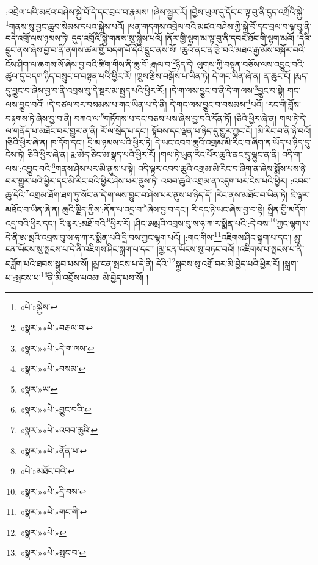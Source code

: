 :འབྲེལ་པའི་མཛའ་བཤེས་སྐྱེ་བོ་དེ་དང་བྲལ་བ་རྣམས། །ཞེས་སྦྱར་རོ། །བྱེས་ཡུལ་དུ་དོང་བ་ལྟ་བུ་ནི་དུད་འགྲོའི་སྐྱེ་\footnote{«པེ་»སྐྱེས་}གནས་སུ་བྱང་ཆུབ་སེམས་དཔའ་སྐྱེས་པའོ། །ཕན་གདགས་འབྲེལ་བའི་མཛའ་བཤེས་ཀྱི་སྐྱེ་བོ་དང་བྲལ་བ་ལྟ་བུ་ནི་བདེ་འགྲོ་ལས་ཉམས་ཏེ། དུད་འགྲོའི་སྐྱེ་གནས་སུ་སྐྱེས་པའོ། །ནོར་གྱི་ལྷག་མ་ལྟ་བུ་ནི་དབང་ཐོང་གི་ལྷག་མའོ། །དེའི་དྲུང་ནས་ཞེས་བྱ་བ་ནི་ནགས་ཚལ་གྱི་བདག་པོ་དེའི་དྲུང་ནས་སོ། །ཆུའི་ནང་ན་རྩེ་བའི་མཐའ་རྒྱ་མོས་བསྐོར་བའི་ངོས་ཤིག་ལ་ཆགས་སོ་ཞེས་བྱ་བའི་ཚིག་གིས་ནི་ཆུ་བོ་:རྒལ་བ་\footnote{«སྣར་»«པེ་»བརྒལ་བ་}ཉིད་དེ། ལུགས་ཀྱི་བསྟན་བཅོས་ལས་འབྱུང་བའི་ཚུལ་དུ་བདག་ཉིད་བསྲུང་བ་བསྟན་པའི་ཕྱིར་རོ། །ཁྲུས་རྩིས་བསྒོས་པ་ཡིན་ཏེ། དེ་གང་ཡིན་ཞེ་ན། ན་ཆུང་ངོ། །རྨད་དུ་བྱུང་བ་ཞེས་བྱ་བ་ནི་འབྲས་བུ་དེ་སྔར་མ་སྤྱད་པའི་ཕྱིར་རོ:། །དེ་ག་ལས་བྱུང་བ་ནི་དེ་ག་ལས་\footnote{«སྣར་»«པེ་»དེ་ག་ལས་}བྱུང་བ་སྟེ། གང་ལས་བྱུང་བའོ། །དེ་བཙལ་བར་བསམས་པ་གང་ཡིན་པ་དེ་ནི། དེ་གང་ལས་བྱུང་བ་བསམས་\footnote{«སྣར་»«པེ་»བསམ་}པའོ། །རང་གི་བློས་བརྟགས་ཏེ་ཞེས་བྱ་བ་ནི། བཀའ་ལ་\footnote{«སྣར་»ཡ་}གཏོགས་པ་དང་བཅས་པས་ཞེས་བྱ་བའི་དོན་ཏོ། །ཅིའི་ཕྱིར་ཞེ་ན། གལ་ཏེ་དེ་ལ་གནོད་པ་མཐོང་བར་གྱུར་ན་ནི། རོ་ལ་སྲེད་པ་དང་། སྟོབས་དང་ལྡན་པ་ཉིད་དུ་གྱུར་ཀྱང་ངོ། །མི་རིང་བ་ནི་ཉེ་བའོ། །ཅིའི་ཕྱིར་ཞེ་ན། ཁ་དོག་དང་། དྲི་མ་ཉམས་པའི་ཕྱིར་ཏེ། དེ་ཡང་འབབ་ཆུའི་འགྲམ་མི་རིང་བ་ཞིག་ན་ཡོད་པ་ཉིད་དུ་ངེས་ཏེ། ཅིའི་ཕྱིར་ཞེ་ན། རྨ་མེད་ཅིང་མ་སྣད་པའི་ཕྱིར་རོ། །གལ་ཏེ་ཡུན་རིང་པོར་ཆུའི་ནང་དུ་ལྷུང་ན་ནི། འདི་ག་ལས་:འབྱུང་བའི་\footnote{«སྣར་»«པེ་»བྱུང་བའི་}གནས་ཤེས་པར་མི་ནུས་པ་སྟེ། འདི་ལྟར་འབབ་ཆུའི་འགྲམ་མི་རིང་བ་ཞིག་ན་ཞེས་སྨོས་པས་ཉེ་བར་གྱུར་པའི་ཕྱིར་དང་མི་རིང་བའི་ཕྱིར་ཤེས་པར་ནུས་ཏེ། འབབ་ཆུའི་འགྲམ་ན་འདུག་པར་ངེས་པའི་ཕྱིར། :འབབ་ཆུ་དེའི་\footnote{«སྣར་»«པེ་»འབབ་ཆུའི་}འགྲམ་ཐོག་ཐག་ཏུ་སོང་ན་དེ་ག་ལས་བྱུང་བ་ཤེས་པར་ནུས་པ་ཉིད་དོ། །རིང་ནས་མཐོང་བ་ཡིན་ཏེ། ཇི་ལྟར་མཐོང་བ་ཡིན་ཞེ་ན། ཆུའི་ལྗིད་ཀྱིས་:ནོན་པ་འདྲ་བ་\footnote{«སྣར་»«པེ་»ནོན་པ་}ཞེས་བྱ་བ་དང་། རི་དང་ཉེ་ཡང་ཞེས་བྱ་བ་སྟེ། སྤྲིན་གྱི་མདོག་འདྲ་བའི་ཕྱིར་དང་། རི་ལྟར་:མཐོ་བའི་\footnote{«པེ་»མཐོང་བའི་}ཕྱིར་རོ། །ཤིང་ཨམྲའི་འབྲས་བུ་ས་ཧ་ཀ་ར་སྨིན་པའི་:དེ་བས་\footnote{«སྣར་»«པེ་»དྲི་བས་}ཀྱང་ལྷག་པ་དེ་ནི་ཨ་མྲའི་འབྲས་བུ་ས་ཧ་ཀ་ར་སྨིན་པའི་དྲི་བས་ཀྱང་ལྷག་པའོ། །:གང་གིས་\footnote{«སྣར་»«པེ་»གང་གི་}འཇིགས་ཤིང་སྐྲག་པ་དང་། མྱ་ངན་ཡོངས་སུ་སྤངས་པ་དེ་ནི་འཇིགས་ཤིང་སྐྲག་པ་དང་། །མྱ་ངན་ཡོངས་སུ་བཏང་བའོ། །འཇིགས་པ་སྤངས་པ་ནི་བཟློག་པའི་ཐབས་སྒྲུབ་པས་སོ། །མྱ་ངན་སྤངས་པ་དེ་ནི། དེའི་\footnote{«སྣར་»«པེ་»}སྐྱབས་སུ་འགྲོ་བར་མི་བྱེད་པའི་ཕྱིར་རོ། །སྐྲག་པ་:སྤངས་པ་\footnote{«སྣར་»«པེ་»སྤང་བ་}ནི་མི་འབྲོས་པའམ། མི་བྱེད་པས་སོ། །

